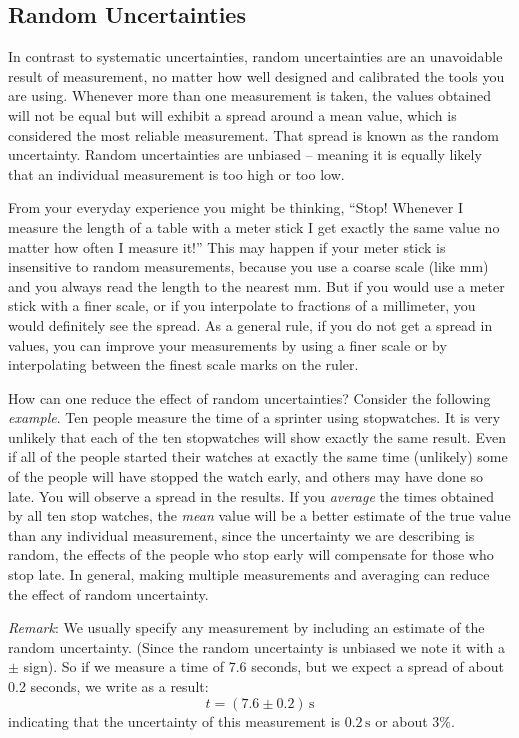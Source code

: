 \documentclass[letterpaper, 12pt]{book}
\newcommand{\myskip}{\vspace{0.5\baselineskip}}
\begin{document}
\subsection{Random Uncertainties}

In contrast to systematic uncertainties, random uncertainties are an unavoidable result of measurement, no matter how well designed and calibrated the tools you are using. Whenever more than one measurement is taken, the values obtained will not be equal but will exhibit a spread around a mean value, which is considered the most reliable measurement. That spread is known as the random uncertainty. Random uncertainties are unbiased -- meaning it is equally likely that an individual measurement is too high or too low. \myskip

From your everyday experience you might be thinking, ``Stop! Whenever I measure the length of a table with a meter stick I get exactly the same value no matter how often I measure it!''   This may happen if your meter stick is insensitive to random measurements, because you use a coarse scale (like $\mathrm{mm}$) and you always read the length to the nearest $\mathrm{mm}$. But if you would use a meter stick with a finer scale, or if you interpolate to fractions of a millimeter, you would definitely see the spread. As a general rule, if you do not get a spread in values, you can improve your measurements by using a finer scale or by interpolating between the finest scale marks on the ruler. \myskip

How can one reduce the effect of random uncertainties?  Consider the following \emph{example}. Ten people measure the time of a sprinter using stopwatches. It is very unlikely that each of the ten stopwatches will show exactly the same result. Even if all of the people started their watches at exactly the same time (unlikely) some of the people will have stopped the watch early, and others may have done so late. You will observe a spread in the results. If you \emph{average} the times obtained by all ten stop watches, the \emph{mean} value will be a better estimate of the true value than any individual measurement, since the uncertainty we are describing is random, the effects of the people who stop early will compensate for those who stop late. In general, making multiple measurements and averaging can reduce the effect of random uncertainty. \myskip

\emph{Remark}: We usually specify any measurement by including an estimate of the random uncertainty. (Since the random uncertainty is unbiased we note it with a $\pm$ sign). So if we measure a time of 7.6 seconds, but we expect a spread of about 0.2 seconds, we write as a result:
\begin{equation}
    t = (7.6\pm 0.2)\,\mathrm{s}
\end{equation}
indicating that the uncertainty of this measurement is $0.2\,\mathrm{s}$ or about $3\%$. \myskip
\end{document}
